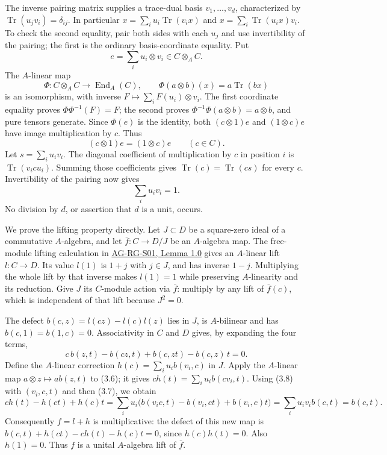 \documentclass[11pt,a4paper,openany]{report}
\begin{document}
The inverse pairing matrix supplies a trace-dual basis \(v_1,\ldots,v_d\), characterized by \(\operatorname{Tr}(u_jv_i)=\delta_{ij}\). In particular \(x=\sum_i u_i\operatorname{Tr}(v_ix)\) and \(x=\sum_i\operatorname{Tr}(u_ix)v_i\). To check the second equality, pair both sides with each \(u_j\) and use invertibility of the pairing; the first is the ordinary basis-coordinate equality. Put \[
e=\sum_i u_i\otimes v_i\in C\otimes_A C.
\] The \(A\)-linear map \[
\Phi:C\otimes_A C\longrightarrow\operatorname{End}_A(C),\qquad
\Phi(a\otimes b)(x)=a\operatorname{Tr}(bx)
\] is an isomorphism, with inverse \(F\mapsto\sum_i F(u_i)\otimes v_i\). The first coordinate equality proves \(\Phi\Phi^{-1}(F)=F\); the second proves \(\Phi^{-1}\Phi(a\otimes b)=a\otimes b\), and pure tensors generate. Since \(\Phi(e)\) is the identity, both \((c\otimes1)e\) and \((1\otimes c)e\) have image multiplication by \(c\). Thus \[
(c\otimes1)e=(1\otimes c)e\qquad(c\in C).
\tag{3.6}
\] Let \(s=\sum_i u_iv_i\). The diagonal coefficient of multiplication by \(c\) in position \(i\) is \(\operatorname{Tr}(v_i c u_i)\). Summing those coefficients gives \(\operatorname{Tr}(c)=\operatorname{Tr}(cs)\) for every \(c\). Invertibility of the pairing now gives \[
\sum_i u_iv_i=1.
\tag{3.7}
\] No division by \(d\), or assertion that \(d\) is a unit, occurs.

We prove the lifting property directly. Let \(J\subset D\) be a square-zero ideal of a commutative \(A\)-algebra, and let \(\bar f:C\to D/J\) be an \(A\)-algebra map. The free-module lifting calculation in \href{https://github.com/KokunoYumeto/open-math-courses/blob/main/docs/courses/AG-RG/AG-RG-S01.md\#1-the-algebra-of-localization}{AG-RG-S01, Lemma 1.0} gives an \(A\)-linear lift \(l:C\to D\). Its value \(l(1)\) is \(1+j\) with \(j\in J\), and has inverse \(1-j\). Multiplying the whole lift by that inverse makes \(l(1)=1\) while preserving \(A\)-linearity and its reduction. Give \(J\) its \(C\)-module action via \(\bar f\): multiply by any lift of \(\bar f(c)\), which is independent of that lift because \(J^2=0\).

The defect \(b(c,z)=l(cz)-l(c)l(z)\) lies in \(J\), is \(A\)-bilinear and has \(b(c,1)=b(1,c)=0\). Associativity in \(C\) and \(D\) gives, by expanding the four terms, \[
c\,b(z,t)-b(cz,t)+b(c,zt)-b(c,z)\,t=0.
\tag{3.8}
\] Define the \(A\)-linear correction \(h(c)=\sum_i u_i b(v_i,c)\) in \(J\). Apply the \(A\)-linear map \(a\otimes z\mapsto a b(z,t)\) to (3.6); it gives \(c h(t)=\sum_i u_i b(cv_i,t)\). Using (3.8) with \((v_i,c,t)\) and then (3.7), we obtain \[
c h(t)-h(ct)+h(c)t
=\sum_i u_i\bigl(b(v_ic,t)-b(v_i,ct)+b(v_i,c)t\bigr)
=\sum_i u_iv_i b(c,t)=b(c,t).
\] Consequently \(f=l+h\) is multiplicative: the defect of this new map is \(b(c,t)+h(ct)-c h(t)-h(c)t=0\), since \(h(c)h(t)=0\). Also \(h(1)=0\). Thus \(f\) is a unital \(A\)-algebra lift of \(\bar f\).
\end{document}
